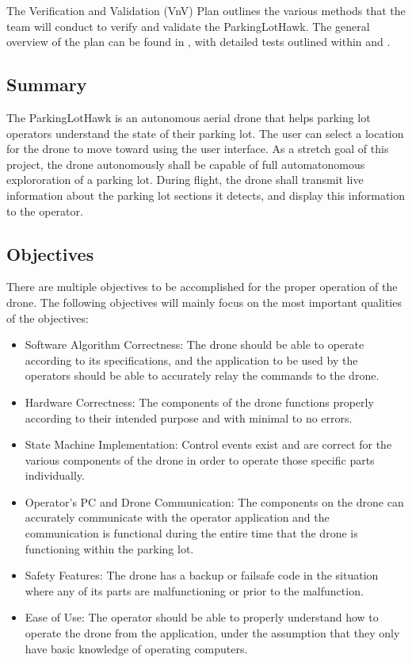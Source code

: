 \documentclass[12pt, titlepage]{article}
\begin{document}
The Verification and Validation (VnV) Plan outlines the various methods that the team will conduct to verify and validate the ParkingLotHawk. The general overview of the plan can be found in , with detailed tests outlined within  and .

\subsection{Summary}

The ParkingLotHawk is an autonomous aerial drone that helps parking lot operators understand the state of their parking lot. The user can select a location for the drone to move toward using the user interface. As a stretch goal of this project, the drone autonomously shall be capable of full automatonomous explororation of a parking lot. During flight, the drone shall transmit live information about the parking lot sections it detects, and display this information to the operator. 

\subsection{Objectives}

There are multiple objectives to be accomplished for the proper operation of the drone. The following objectives will mainly focus on the most important qualities of the objectives:

\begin{itemize}
    \item Software Algorithm Correctness: The drone should be able to operate according to its specifications, and the application to be used by the operators should be able to accurately relay the commands to the drone.
    \item Hardware Correctness: The components of the drone functions properly according to their intended purpose and with minimal to no errors.
    \item State Machine Implementation: Control events exist and are correct for the various components of the drone in order to operate those specific parts individually.
    \item Operator's PC and Drone Communication: The components on the drone can accurately communicate with the operator application and the communication is functional during the entire time that the drone is functioning within the parking lot.
    \item Safety Features: The drone has a backup or failsafe code in the situation where any of its parts are malfunctioning or prior to the malfunction.
    \item Ease of Use: The operator should be able to properly understand how to operate the drone from the application, under the assumption that they only have basic knowledge of operating computers.
\end{itemize}
\end{document}
